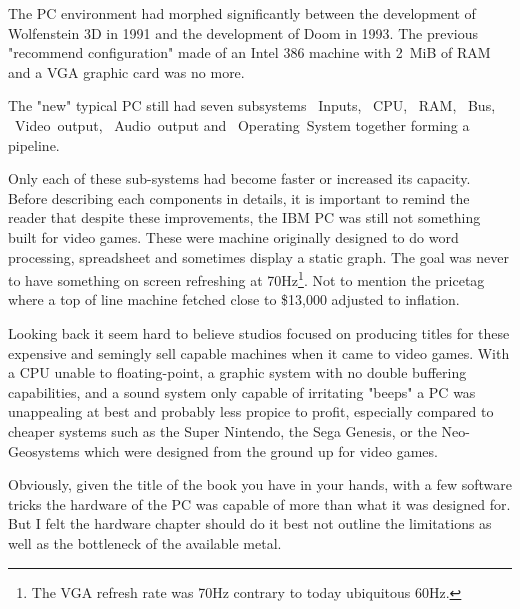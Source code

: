 The PC environment had morphed significantly between the development of Wolfenstein 3D in 1991 and the development of Doom in 1993. The previous "recommend configuration" made of an Intel 386 machine with 2~MiB of RAM and a VGA graphic card was no more.\\
\par
The "new" typical PC still had seven subsystems ~Inputs, ~CPU, ~RAM, ~Bus, ~Video~output, ~Audio~output and ~Operating~System together forming a pipeline.\\
\par
{}
\par
Only each of these sub-systems had become faster or increased its capacity. Before describing each components in details, it is important to remind the reader that despite these improvements, the IBM PC was still not something built for video games. These were machine originally designed to do word processing, spreadsheet and sometimes display a static graph. The goal was never to have something on screen refreshing at 70Hz\footnote{The VGA refresh rate was 70Hz contrary to today ubiquitous 60Hz.}. Not to mention the pricetag where a top of line machine fetched close to \$13,000 adjusted to inflation.\\
\par Looking back it seem hard to believe studios focused on producing titles for these expensive and semingly sell capable machines when it came to video games. With a CPU unable to floating-point, a graphic system with no double buffering capabilities, and a sound system only capable of irritating "beeps" a PC was unappealing at best and probably less propice to profit, especially compared to cheaper systems such as the Super Nintendo, the Sega Genesis, or the Neo-Geosystems which were designed from the ground up for video games. \\
\par
Obviously, given the title of the book you have in your hands, with a few software tricks the hardware of the PC was capable of more than what it was designed for. But I felt the hardware chapter should do it best not outline the limitations as well as the bottleneck of the available metal.\\
\par




